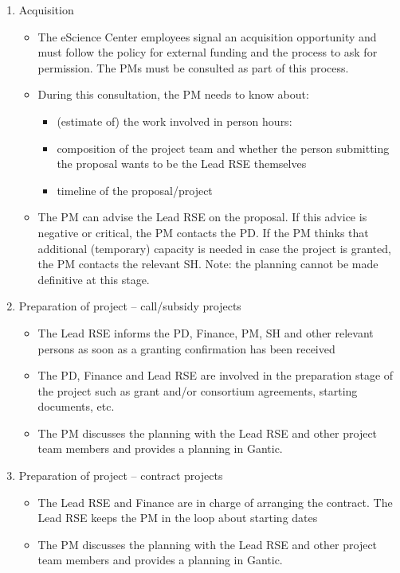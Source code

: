 \begin{enumerate}[label=\arabic*.,ref=\arabic*]
\item Acquisition
\begin{itemize}
\item The eScience Center employees signal an acquisition opportunity and must follow the policy for
external funding and the process to ask for permission. The PMs must be consulted as part of this process.
\item During this consultation, the PM needs to know about:
\begin{itemize}
\item (estimate of) the work involved in person hours:
\item composition of the project team and whether the person submitting the proposal wants to be the Lead RSE themselves
\item timeline of the proposal/project
\end{itemize}
\item The PM can advise the Lead RSE on the proposal. If this advice is negative or critical, the PM
contacts the PD. If the PM thinks that additional (temporary) capacity is needed in case the project is granted, the PM
contacts the relevant SH. Note: the planning cannot be made definitive at this stage.
\end{itemize}
\item Preparation of project – call/subsidy projects
\begin{itemize}
\item The Lead RSE informs the PD, Finance, PM, SH and other relevant persons as soon as a granting
confirmation has been received
\item The PD, Finance and Lead RSE are involved in the preparation stage of the project such as grant
and/or consortium agreements, starting documents, etc.
\item The PM discusses the planning with the Lead RSE and other project team members and provides a
planning in Gantic.
\end{itemize}
\item Preparation of project – contract projects
\begin{itemize}
\item The Lead RSE and Finance are in charge of arranging the contract. The Lead RSE keeps the PM in
the loop about starting dates
\item The PM discusses the planning with the Lead RSE and other project team members and provides a
planning in Gantic.

\end{itemize}
\end{enumerate}
